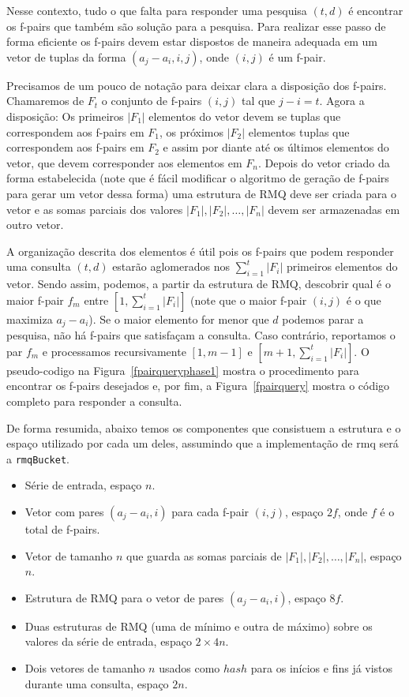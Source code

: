 \documentclass[12pt]{article}
\begin{document}
Nesse contexto, tudo o que falta para responder uma pesquisa $(t,d)$
é encontrar os f-pairs que também são solução para a pesquisa. 
Para realizar esse passo de forma eficiente os f-pairs devem
estar dispostos de maneira adequada em um vetor de tuplas da forma $(a_j - a_i, i, j)$,
onde $(i, j)$ é um f-pair.

Precisamos de um pouco de notação para deixar clara a disposição dos f-pairs.
Chamaremos de $F_t$ o conjunto de f-pairs $(i, j)$ tal que $j - i = t$. Agora 
a disposição: Os primeiros $|F_1|$ elementos do vetor devem se tuplas que correspondem aos f-pairs em $F_1$,
os próximos $|F_2|$ elementos tuplas que correspondem aos f-pairs em $F_2$ e assim por diante 
até os últimos elementos do vetor, que devem corresponder aos elementos em $F_n$.
Depois do vetor criado da forma estabelecida (note que é fácil modificar o 
algoritmo de geração de f-pairs para gerar um vetor dessa forma) uma estrutura de
RMQ deve ser criada para o vetor e as somas parciais dos valores $|F_1|, |F_2|, \ldots, |F_n|$
devem ser armazenadas em outro vetor. 

A organização descrita dos elementos é útil pois os f-pairs que podem responder uma consulta $(t,d)$ 
estarão aglomerados nos $\sum_{i = 1}^t |F_i|$ primeiros elementos do vetor. Sendo assim,
podemos, a partir da estrutura de RMQ, descobrir qual é o maior f-pair
$f_m$ entre $[1, \sum_{i = 1}^t |F_i|]$ (note que o maior f-pair $(i, j)$ é o que maximiza $a_j - a_i$).
Se o maior elemento for menor que $d$ podemos parar a pesquisa, não há f-pairs que satisfaçam a consulta. Caso contrário, reportamos
o par $f_m$ e processamos recursivamente $[1, m - 1]$ e $[m + 1, \sum_{i=1}^t |F_i|]$.
O pseudo-codigo na Figura~\ref{fpairqueryphase1} mostra o procedimento para encontrar
os f-pairs desejados e, por fim, a Figura~\ref{fpairquery} mostra o código completo
para responder a consulta.

De forma resumida, abaixo temos os componentes que consistuem a estrutura e
o espaço utilizado por cada um deles, assumindo que a implementação de rmq será a \verb|rmqBucket|.

\begin{center}
\begin{itemize}
\item Série de entrada, espaço $n$.
\item Vetor com pares $(a_j - a_i, i)$ para cada f-pair $(i, j)$, espaço $2f$, onde $f$ é o total de f-pairs.
\item Vetor de tamanho $n$ que guarda as somas parciais de $|F_1|, |F_2|, \ldots, |F_n|$, espaço $n$.
\item Estrutura de RMQ para o vetor de pares $(a_j - a_i, i)$, espaço $8f$.
\item Duas estruturas de RMQ (uma de mínimo e outra de máximo) sobre os valores da série de entrada, espaço $2\times4n$.
\item Dois vetores de tamanho $n$ usados como $hash$ para os inícios e fins já vistos durante uma consulta, espaço $2n$.
\end{itemize}
\end{center}
\end{document}
